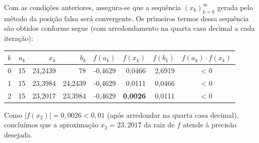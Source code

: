 \documentclass[12pt,a4paper]{article}
\begin{document}
\begin{ExerciseList}
Com as condições anteriores, assegura-se que a sequência \((x_k)_{k=0}^\infty\) gerada pelo método da posição falsa será convergente. Os primeiros termos dessa sequência são obtidos conforme segue (com arredondamento na quarta casa decimal a cada iteração):
\medskip
\begin{center}
\begin{tabular}{rrrrrrrc}
\hline
$k$ & $a_k$ & $x_k$ & $b_k$ & $f(a_k)$ & $f(x_k)$ & $f(b_k)$ & $f(a_k) \cdot f(x_k)$ \\
\hline
0 & 15 & 24,2439 & 78 & -0,4629 & 0,0466 & 2,6919 & < 0 \\
1 & 15 & 23,3984 & 24,2439 & -0,4629 & 0,0111 & 0,0466 & < 0 \\
2 & 15 & 23,2017 & 23,3984 & -0,4629 & \textbf{0,0026} & 0,0111 & < 0 \\
\hline
\end{tabular}
\end{center}
\medskip
Como \(|f(x_2)| = 0,0026 < 0,01\) (após arredondar na quarta casa decimal), concluímos que a aproximação \(x_2 = 23,2017\) da raiz de \(f\) atende à precisão desejada.


\end{ExerciseList}
\end{document}
